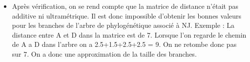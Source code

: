 \documentclass[
	12pt, %
]{fphw}
\begin{document}
\begin{center}
\begin{itemize}
\begin{center}
			\end{center}
		\item Après vérification, on se rend compte que la matrice de distance n'était pas additive ni ultramétrique. Il est donc impossible d'obtenir les bonnes valeurs pour les branches de l'arbre de phylogénétique associé à NJ. Exemple : La distance entre A et D dans la matrice est de 7. Lorsque l'on regarde le chemin de A a D dans l'arbre on a 2.5+1.5+2.5+2.5 = 9. On ne retombe donc pas sur 7. On a donc une approximation de la taille des branches.
	\end{itemize}
	\
\end{center}

\end{document}
